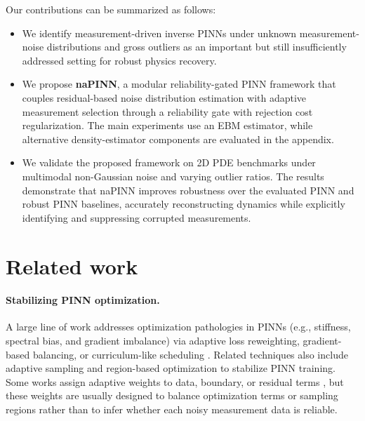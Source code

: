 \documentclass{article}
\theoremstyle{plain}
\theoremstyle{definition}
\theoremstyle{remark}
\begin{document}
Our contributions can be summarized as follows:

\begin{itemize}
    \item We identify measurement-driven inverse PINNs under unknown measurement-noise distributions and gross outliers as an important but still insufficiently addressed setting for robust physics recovery.
    \item We propose \textbf{naPINN}, a modular reliability-gated PINN framework that couples residual-based noise distribution estimation with adaptive measurement selection through a reliability gate with rejection cost regularization. The main experiments use an EBM estimator, while alternative density-estimator components are evaluated in the appendix.
    \item We validate the proposed framework on 2D PDE benchmarks under multimodal non-Gaussian noise and varying outlier ratios. The results demonstrate that naPINN improves robustness over the evaluated PINN and robust PINN baselines, accurately reconstructing dynamics while explicitly identifying and suppressing corrupted measurements.
\end{itemize}

\section{Related work}
\label{sec:relatedwork}

\paragraph{Stabilizing PINN optimization.}
A large line of work addresses optimization pathologies in PINNs (e.g., stiffness, spectral bias, and gradient imbalance) via adaptive loss reweighting, gradient-based balancing, or curriculum-like scheduling \cite{Rahaman2019, Wang2021, SWang2022, CWang2022, Chen2018, Xiang2022, Hwang2024, Bischof2025}.  
Related techniques also include adaptive sampling \cite{Nabian2021} and region-based optimization \cite{Wu2024, duan2025} to stabilize PINN training. Some works assign adaptive weights to data, boundary, or residual terms \cite{McClenny2023}, but these weights are usually designed to balance optimization terms or sampling regions rather than to infer whether each noisy measurement data is reliable.
\end{document}
